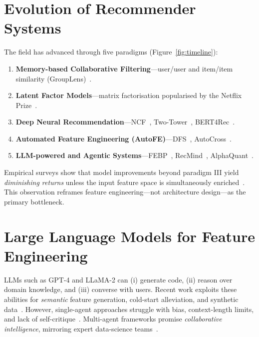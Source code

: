 \section{Evolution of Recommender Systems}
The field has advanced through five paradigms (Figure~\ref{fig:timeline}):
\begin{enumerate}[label=\textbf{P\arabium\arabic*}:, leftmargin=3em]
  \item \textbf{Memory-based Collaborative Filtering}---user/user and item/item similarity (GroupLens)~\cite{Resnick1994GroupLens}.
  \item \textbf{Latent Factor Models}---matrix factorisation popularised by the Netflix Prize~\cite{Koren2009MatrixFactorization}.
  \item \textbf{Deep Neural Recommendation}---NCF~\cite{He2017NCF}, Two-Tower~\cite{Cheng2016WideDeep}, BERT4Rec~\cite{Sun2019BERT4Rec}.
  \item \textbf{Automated Feature Engineering (AutoFE)}---DFS~\cite{Kanter2015Featuretools}, AutoCross~\cite{Lu2021AutoCross}.
  \item \textbf{LLM-powered and Agentic Systems}---FEBP~\cite{Zou2025FEBP}, RecMind~\cite{Wang2024RecMind}, AlphaQuant~\cite{Yuksel2025AlphaQuant}.
\end{enumerate}
Empirical surveys show that model improvements beyond paradigm III yield \emph{diminishing returns} unless the input feature space is simultaneously enriched~\cite{Zhao2024FeatureSurvey}.  This observation reframes feature engineering---not architecture design---as the primary bottleneck.

\section{Large Language Models for Feature Engineering}
LLMs such as GPT-4 and LLaMA-2 can (i) generate code, (ii) reason over domain knowledge, and (iii) converse with users.  Recent work exploits these abilities for \emph{semantic} feature generation, cold-start alleviation, and synthetic data~\cite{KALM4Rec2024,KAR2023}.  However, single-agent approaches struggle with bias, context-length limits, and lack of self-critique~\cite{litterature_review}.  Multi-agent frameworks promise \emph{collaborative intelligence}, mirroring expert data-science teams~\cite{Park2023GenerativeAgents,Wang2024RecMind}.

